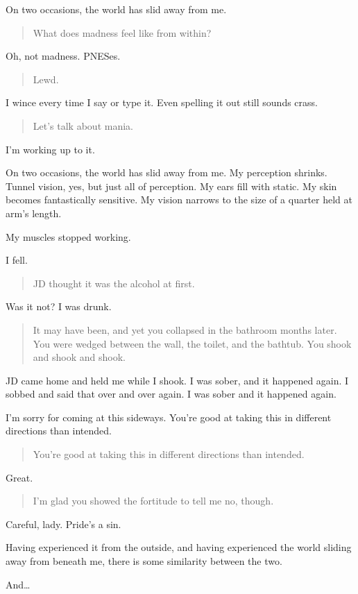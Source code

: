 On two occasions, the world has slid away from me.

\begin{quote}
What does madness feel like from within?
\end{quote}

Oh, not madness. PNESes.

\begin{quote}
Lewd.
\end{quote}

I wince every time I say or type it. Even spelling it out still sounds crass.

\begin{quote}
Let's talk about mania.
\end{quote}

I'm working up to it.

On two occasions, the world has slid away from me. My perception shrinks. Tunnel vision, yes, but just all of perception. My ears fill with static. My skin becomes fantastically sensitive. My vision narrows to the size of a quarter held at arm's length.

My muscles stopped working.

I fell.

\begin{quote}
JD thought it was the alcohol at first.
\end{quote}

Was it not? I was drunk.

\begin{quote}
It may have been, and yet you collapsed in the bathroom months later. You were wedged between the wall, the toilet, and the bathtub. You shook and shook and shook.
\end{quote}

JD came home and held me while I shook. I was sober, and it happened again. I sobbed and said that over and over again. I was sober and it happened again.

I'm sorry for coming at this sideways. You're good at taking this in different directions than intended.

\begin{quote}
You're good at taking this in different directions than intended.
\end{quote}

Great.

\begin{quote}
I'm glad you showed the fortitude to tell me no, though.
\end{quote}

Careful, lady. Pride's a sin.

Having experienced it from the outside, and having experienced the world sliding away from beneath me, there is some similarity between the two.

And\ldots{}

